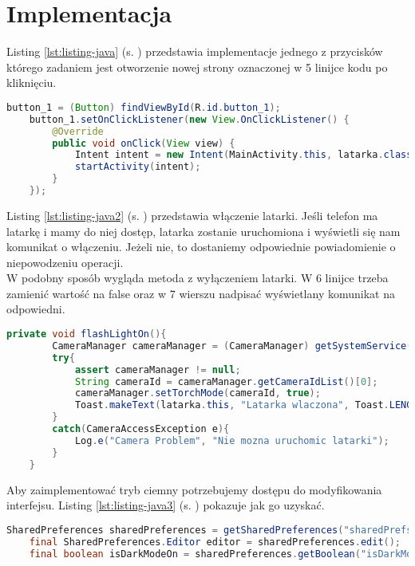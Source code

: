 	\newpage
\section{Implementacja}		%

\hspace{0.60cm}Listing \ref{lst:listing-java} (s. \pageref{lst:listing-java}) przedstawia implementacje jednego z przycisków którego zadaniem jest otworzenie nowej strony oznaczonej w 5 linijce kodu po kliknięciu. 
\begin{lstlisting}[caption=Menu - Działanie Przycisków, label={lst:listing-java}, language=Java]
	button_1 = (Button) findViewById(R.id.button_1);
	button_1.setOnClickListener(new View.OnClickListener() {
		@Override
		public void onClick(View view) {
			Intent intent = new Intent(MainActivity.this, latarka.class);
			startActivity(intent);
		}
	});
\end{lstlisting}


Listing \ref{lst:listing-java2} (s. \pageref{lst:listing-java2}) przedstawia włączenie latarki. Jeśli telefon ma latarkę i mamy do niej dostęp, latarka zostanie uruchomiona i wyświetli się nam komunikat o włączeniu. Jeżeli nie, to dostaniemy odpowiednie powiadomienie o niepowodzeniu operacji. \\
W podobny sposób wygląda metoda z wyłączeniem latarki. W 6 linijce trzeba zamienić wartość na false oraz w 7 wierszu nadpisać wyświetlany komunikat na odpowiedni.
\begin{lstlisting}[caption=Latarka - Włączenie/wyłączenie latarki, label={lst:listing-java2}, language=Java]
	private void flashLightOn(){
		CameraManager cameraManager = (CameraManager) getSystemService(Context.CAMERA_SERVICE);
		try{
			assert cameraManager != null;
			String cameraId = cameraManager.getCameraIdList()[0];
			cameraManager.setTorchMode(cameraId, true);
			Toast.makeText(latarka.this, "Latarka wlaczona", Toast.LENGTH_SHORT).show();
		}
		catch(CameraAccessException e){
			Log.e("Camera Problem", "Nie mozna uruchomic latarki");
		}
	}
\end{lstlisting}

\newpage


Aby zaimplementować tryb ciemny potrzebujemy dostępu do modyfikowania \\ interfejsu. Listing \ref{lst:listing-java3} (s. \pageref{lst:listing-java3}) pokazuje jak go uzyskać. 
\begin{lstlisting}[caption=Tryb Ciemny - Modyfikowanie interfejsu, label={lst:listing-java3}, language=Java]
	SharedPreferences sharedPreferences = getSharedPreferences("sharedPrefs", MODE_PRIVATE);
	final SharedPreferences.Editor editor = sharedPreferences.edit();
	final boolean isDarkModeOn = sharedPreferences.getBoolean("isDarkModeOn", false);
\end{lstlisting}


